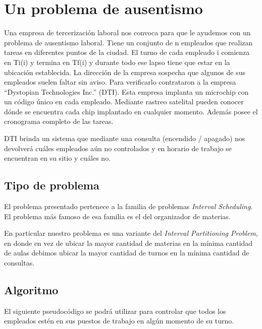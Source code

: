  \section{Un problema de ausentismo}
 Una empresa de tercerización laboral nos convoca para que le ayudemos con un problema de ausentismo laboral. Tiene un conjunto de n empleados que realizan tareas en diferentes puntos de la ciudad. El turno de cada empleado i comienza en Ti(i) y termina en Tf(i) y durante todo ese lapso tiene que estar en la ubicación establecida. La dirección de la empresa sospecha que algunos de sus empleados suelen faltar sin aviso. Para verificarlo contrataron a la empresa “Dystopian Technologies Inc.” (DTI). Esta empresa implanta un microchip con un código único en cada empleado. Mediante rastreo satelital pueden conocer dónde se encuentra cada chip implantado en cualquier momento. Además posee el cronograma completo de las tareas.\newline
 
 DTI brinda un sistema que mediante una consulta (encendido / apagado) nos devolverá cuáles empleados aún no controlados y en horario de trabajo se encuentran en su sitio y cuáles no.\newline

\subsection{Tipo de problema}
El problema presentado pertenece a la familia de problemas \emph{Interval Scheduling}. El problema más famoso de esa familia es el del organizador de materias. \newline 

En particular nuestro problema es una variante del \emph{Interval Partitioning Problem}, en donde en vez de ubicar la mayor cantidad de materias en la mínima cantidad de aulas debimos ubicar la mayor cantidad de turnos en la mínima cantidad de consultas.\newpage

\subsection{Algoritmo}
El siguiente pseudocódigo se podrá utilizar para controlar que todos los empleados estén en sus puestos de trabajo en algún momento de su turno. \newline

